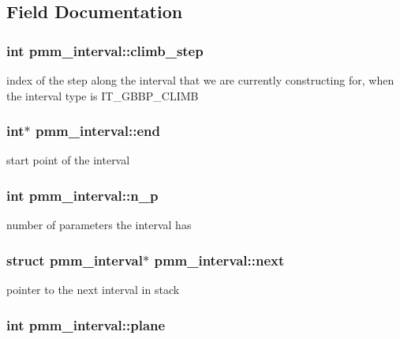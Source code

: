 \subsection{Field Documentation}
\hypertarget{structpmm__interval_aa11fa2ec3e9bd29fd82e9a19ca1d070b}{
\subsubsection[{climb\-\_\-step}]{\setlength{\rightskip}{0pt plus 5cm}int pmm\-\_\-interval\-::climb\-\_\-step}}\label{structpmm__interval_aa11fa2ec3e9bd29fd82e9a19ca1d070b}
index of the step along the interval that we are currently constructing for, when the interval type is I\-T\-\_\-\-G\-B\-B\-P\-\_\-\-C\-L\-I\-M\-B \hypertarget{structpmm__interval_aac71aae8e85434b2e59d90206a1e3555}{
\subsubsection[{end}]{\setlength{\rightskip}{0pt plus 5cm}int$\ast$ pmm\-\_\-interval\-::end}}\label{structpmm__interval_aac71aae8e85434b2e59d90206a1e3555}
start point of the interval \hypertarget{structpmm__interval_ab448b7abb9a5a7c440f684acaa20ff68}{
\subsubsection[{n\-\_\-p}]{\setlength{\rightskip}{0pt plus 5cm}int pmm\-\_\-interval\-::n\-\_\-p}}\label{structpmm__interval_ab448b7abb9a5a7c440f684acaa20ff68}
number of parameters the interval has \hypertarget{structpmm__interval_aecf4d52e301ad5bea383ca6a7db7fc1f}{
\subsubsection[{next}]{\setlength{\rightskip}{0pt plus 5cm}struct {\bf pmm\-\_\-interval}$\ast$ pmm\-\_\-interval\-::next}}\label{structpmm__interval_aecf4d52e301ad5bea383ca6a7db7fc1f}
pointer to the next interval in stack \hypertarget{structpmm__interval_a57e7d507d375f4c049c0536755baa65e}{
\subsubsection[{plane}]{\setlength{\rightskip}{0pt plus 5cm}int pmm\-\_\-interval\-::plane}}\label{structpmm__interval_a57e7d507d375f4c049c0536755baa65e}
